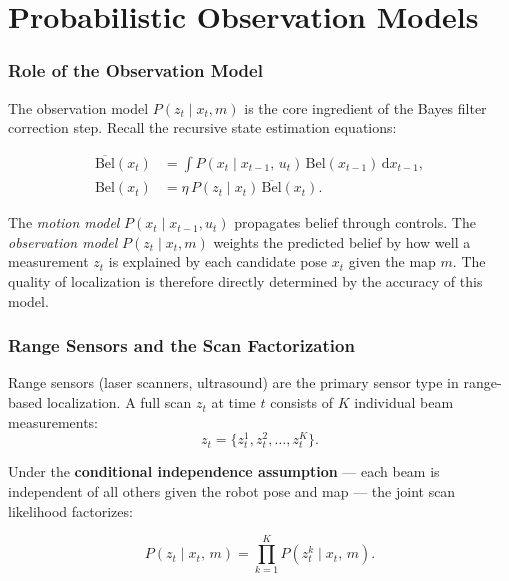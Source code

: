 \documentclass[11pt,a4paper]{article}
\theoremstyle{definition}
\theoremstyle{plain}
\theoremstyle{remark}
\begin{document}
\part{Probabilistic Observation Models}

\section{Role of the Observation Model}

The observation model $P(z_t \mid x_t, m)$ is the core ingredient of the Bayes filter correction step. Recall the recursive state estimation equations:

\begin{tcolorbox}[colback=blue!5!white,colframe=blue!75!black,title=\textbf{Bayes Filter: Prediction and Correction}]
\begin{align*}
    \overline{\mathrm{Bel}}(x_t) &= \int P(x_t \mid x_{t-1},\, u_t)\,\mathrm{Bel}(x_{t-1})\,\mathrm{d}x_{t-1}, \\
    \mathrm{Bel}(x_t) &= \eta\, P(z_t \mid x_t)\,\overline{\mathrm{Bel}}(x_t).
\end{align*}
\end{tcolorbox}

The \emph{motion model} $P(x_t \mid x_{t-1}, u_t)$ propagates belief through controls. The \emph{observation model} $P(z_t \mid x_t, m)$ weights the predicted belief by how well a measurement $z_t$ is explained by each candidate pose $x_t$ given the map $m$. The quality of localization is therefore directly determined by the accuracy of this model.

\section{Range Sensors and the Scan Factorization}

Range sensors (laser scanners, ultrasound) are the primary sensor type in range-based localization. A full scan $z_t$ at time $t$ consists of $K$ individual beam measurements:
\[
    z_t = \{z_t^1, z_t^2, \ldots, z_t^K\}.
\]

Under the \textbf{conditional independence assumption} --- each beam is independent of all others given the robot pose and map --- the joint scan likelihood factorizes:

\begin{tcolorbox}[colback=blue!5!white,colframe=blue!75!black,title=\textbf{Scan Likelihood Factorization}]
\[
    P(z_t \mid x_t,\, m) = \prod_{k=1}^{K} P(z_t^k \mid x_t,\, m).
\]
\end{tcolorbox}
\end{document}
